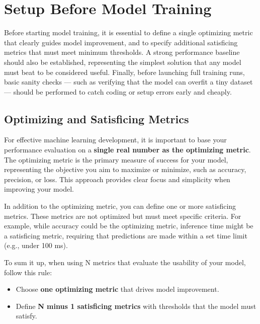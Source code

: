 \documentclass[12pt,openany]{book}
\begin{document}
\chapter{Setup Before Model Training}

\begin{examplebox} 
Before starting model training, it is essential to define a single optimizing metric that clearly guides model improvement, and to specify additional satisficing metrics that must meet minimum thresholds. A strong performance baseline should also be established, representing the simplest solution that any model must beat to be considered useful. Finally, before launching full training runs, basic sanity checks — such as verifying that the model can overfit a tiny dataset — should be performed to catch coding or setup errors early and cheaply. 
\end{examplebox}



\section{Optimizing and Satisficing Metrics}

For effective machine learning development, it is important to base your performance evaluation on a \textbf{single real number as the optimizing metric}. The optimizing metric is the primary measure of success for your model, representing the objective you aim to maximize or minimize, such as accuracy, precision, or loss. This approach provides clear focus and simplicity when improving your model. \newline

In addition to the optimizing metric, you can define one or more satisficing metrics. These metrics are not optimized but must meet specific criteria. For example, while accuracy could be the optimizing metric, inference time might be a satisficing metric, requiring that predictions are made within a set time limit (e.g., under 100 ms). \newline \newline

To sum it up, when using N metrics that evaluate the usability of your model, follow this rule:
\begin{itemize}
    \item Choose \textbf{one optimizing metric} that drives model improvement.
    \item Define \textbf{N minus 1 satisficing metrics} with thresholds that the model must satisfy.
\end{itemize}
\end{document}
